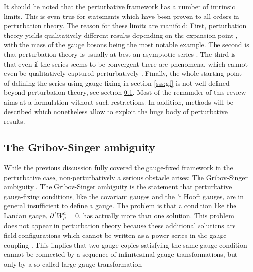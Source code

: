 \documentclass[final,12pt]{article}
\newcommand*{\pd}{\partial}
\newcommand*{\1}{1\!\!\!\bot}
\begin{document}
It should be noted that the perturbative framework has a number of intrinsic limits. This is even true for statements which have been proven to all orders in perturbation theory. The reason for these limits are manifold: First, perturbation theory yields qualitatively different results depending on the expansion point \cite{Lee:1974zg}, with the mass of the gauge bosons being the most notable example. The second is that perturbation theory is usually at best an asymptotic series \cite{Negele:1988vy,Rivers:1987hi}. The third is that even if the series seems to be convergent there are phenomena, which cannot even be qualitatively captured perturbatively \cite{Shifman:2012zz,Haag:1992hx,Rivers:1987hi}. Finally, the whole starting point of defining the series using gauge-fixing in section \ref{sss:gf} is not well-defined beyond perturbation theory, see section \ref{ss:gribov}. Most of the remainder of this review aims at a formulation without such restrictions. In addition, methods will be described which nonetheless allow to exploit the huge body \cite{pdg,Bohm:2001yx,Djouadi:2005gi,Dawson:2018dcd} of perturbative results. 

\subsection{The Gribov-Singer ambiguity}\label{ss:gribov}

While the previous discussion fully covered the gauge-fixed framework in the perturbative case, non-perturbatively a serious obstacle arises: The Gribov-Singer ambiguity \cite{Gribov:1977wm,Singer:1978dk,vanBaal:1997gu,vanBaal:1991zw,Dell'Antonio:1991xt,Maas:2011se,Vandersickel:2012tg,Sobreiro:2005ec}. The Gribov-Singer ambiguity is the statement that perturbative gauge-fixing conditions, like the covariant gauges and the 't Hooft gauges, are in general insufficient to define a gauge. The problem is that a condition like the Landau gauge, $\pd^\mu W_\mu^a=0$, has actually more than one solution. This problem does not appear in perturbation theory because these additional solutions are field-configurations which cannot be written as a power series in the gauge coupling \cite{Gribov:1977wm}. This implies that two gauge copies satisfying the same gauge condition cannot be connected by a sequence of infinitesimal gauge transformations, but only by a so-called large gauge transformation \cite{Gribov:1977wm}.
\end{document}
